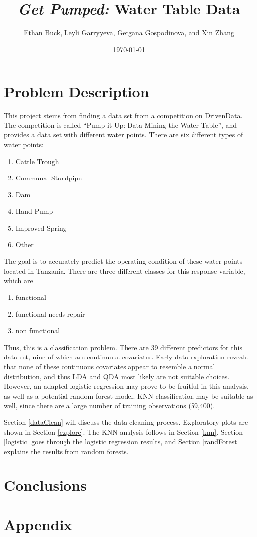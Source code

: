 \documentclass{article}
\title{\textit{Get Pumped:} Water Table Data}
\author{Ethan Buck, Leyli Garryyeva, Gergana Gospodinova, and Xin Zhang}
\date{\today}
\begin{document}
\maketitle

\section{Problem Description}
This project stems from finding a data set from a competition on DrivenData.  The competition is called ``Pump it Up: Data Mining the Water Table'', and provides a data set with different water points.  There are six different types of water points:

\begin{enumerate}
    \item Cattle Trough
    \item Communal Standpipe
    \item Dam
    \item Hand Pump
    \item Improved Spring
    \item Other
\end{enumerate}

The goal is to accurately predict the operating condition of these water points located in Tanzania.  There are three different classes for this response variable, which are

\begin{enumerate}
    \item functional
    \item functional needs repair
    \item non functional
\end{enumerate}

Thus, this is a classification problem.  There are 39 different predictors for this data set, nine of which are continuous covariates.  Early data exploration reveals that none of these continuous covariates appear to resemble a normal distribution, and thus LDA and QDA most likely are not suitable choices.  However, an adapted logistic regression may prove to be fruitful in this analysis, as well as a potential random forest model.  KNN classification may be suitable as well, since there are a large number of training observations (59,400).

Section \ref{dataClean} will discuss the data cleaning process.  Exploratory plots are shown in Section \ref{explore}.  The KNN analysis follows in Section \ref{knn}.  Section \ref{logistic} goes through the logistic regression results, and Section \ref{randForest} explains the results from random forests.











\section{Conclusions}

\newpage
\section{Appendix}


\end{document}
